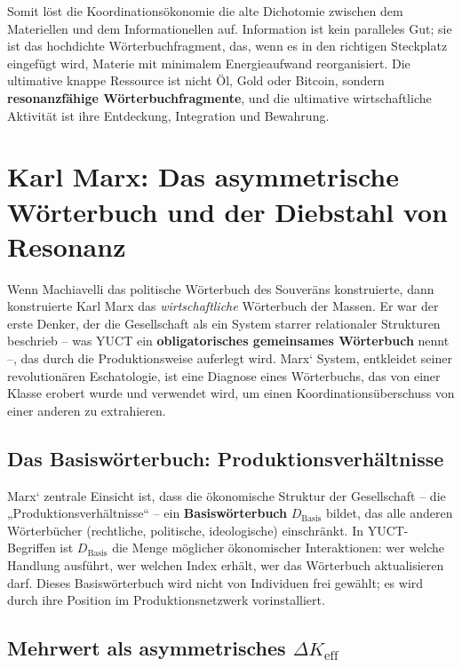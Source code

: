 \documentclass[12pt,a4paper]{article}
\newcommand{\Keff}{K_{\mathrm{eff}}}
\begin{document}
Somit löst die Koordinationsökonomie die alte Dichotomie zwischen dem Materiellen und dem Informationellen auf. Information ist kein paralleles Gut; sie ist das hochdichte Wörterbuchfragment, das, wenn es in den richtigen Steckplatz eingefügt wird, Materie mit minimalem Energieaufwand reorganisiert. Die ultimative knappe Ressource ist nicht Öl, Gold oder Bitcoin, sondern \textbf{resonanzfähige Wörterbuchfragmente}, und die ultimative wirtschaftliche Aktivität ist ihre Entdeckung, Integration und Bewahrung.

\section{Karl Marx: Das asymmetrische Wörterbuch und der Diebstahl von Resonanz}
\label{sec:marx}

Wenn Machiavelli das politische Wörterbuch des Souveräns konstruierte, dann konstruierte Karl Marx das \emph{wirtschaftliche} Wörterbuch der Massen. Er war der erste Denker, der die Gesellschaft als ein System starrer relationaler Strukturen beschrieb – was YUCT ein \textbf{obligatorisches gemeinsames Wörterbuch} nennt –, das durch die Produktionsweise auferlegt wird. Marx‘ System, entkleidet seiner revolutionären Eschatologie, ist eine Diagnose eines Wörterbuchs, das von einer Klasse erobert wurde und verwendet wird, um einen Koordinationsüberschuss von einer anderen zu extrahieren.

\subsection{Das Basiswörterbuch: Produktionsverhältnisse}

Marx‘ zentrale Einsicht ist, dass die ökonomische Struktur der Gesellschaft – die „Produktionsverhältnisse“ – ein \textbf{Basiswörterbuch} \(D_{\text{Basis}}\) bildet, das alle anderen Wörterbücher (rechtliche, politische, ideologische) einschränkt. In YUCT-Begriffen ist \(D_{\text{Basis}}\) die Menge möglicher ökonomischer Interaktionen: wer welche Handlung ausführt, wer welchen Index erhält, wer das Wörterbuch aktualisieren darf. Dieses Basiswörterbuch wird nicht von Individuen frei gewählt; es wird durch ihre Position im Produktionsnetzwerk vorinstalliert.

\subsection{Mehrwert als asymmetrisches \(\Delta\Keff\)}
\end{document}
